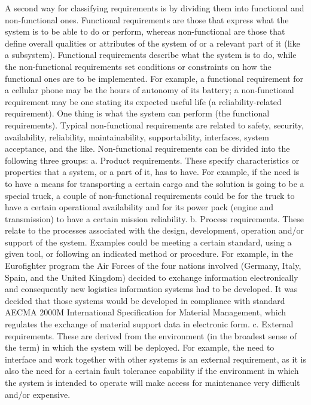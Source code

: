 A second way for classifying requirements is by dividing them into functional and non-functional ones. Functional requirements are those that express what the system is to be able to do or perform, whereas non-functional are those that define overall qualities or attributes of the system of or a relevant part of it (like a subsystem). Functional requirements describe what the system is to do, while the non-functional requirements set conditions or constraints on how the functional ones are to be implemented. For example, a functional requirement for a cellular phone may be the hours of autonomy of its battery; a non-functional requirement may be one stating its expected useful life (a reliability-related requirement). One thing is what the system can perform (the functional requirements). Typical non-functional requirements are related to safety, security, availability, reliability, maintainability, supportability, interfaces, system acceptance, and the like. Non-functional requirements can be divided into the following three groups:
    a. Product requirements. These specify characteristics or properties that a system, or a part of it, has to have. For example, if the need is to have a means for transporting a certain cargo and the solution is going to be a special truck, a couple of non-functional requirements could be for the truck to have a certain operational availability and for its power pack (engine and transmission) to have a certain mission reliability.
    b. Process requirements. These relate to the processes associated with the design, development, operation and/or support of the system. Examples could be meeting a certain standard, using a given tool, or following an indicated method or procedure. For example, in the Eurofighter program the Air Forces of the four nations involved (Germany, Italy, Spain, and the United Kingdom) decided to exchange information electronically and consequently new logistics information systems had to be developed. It was decided that those systems would be developed in compliance with standard AECMA 2000M International Specification for Material Management, which regulates the exchange of material support data in electronic form.
    c. External requirements. These are derived from the environment (in the broadest sense of the term) in which the system will be deployed. For example, the need to interface and work together with other systems is an external requirement, as it is also the need for a certain fault tolerance capability if the environment in which the system is intended to operate will make access for maintenance very difficult and/or expensive.
    
